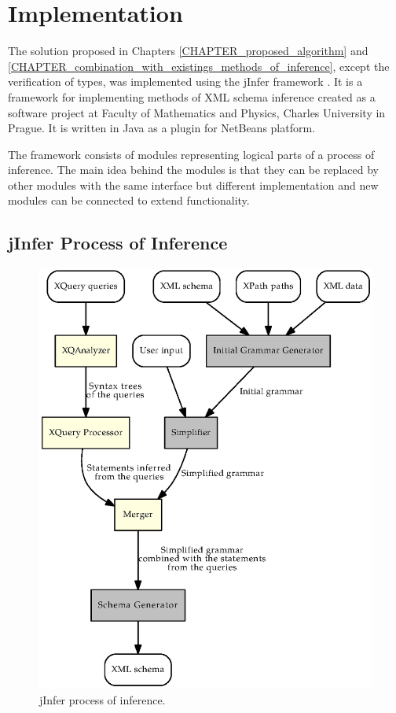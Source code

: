 \chapter{Implementation}
The solution proposed in Chapters \ref{CHAPTER_proposed_algorithm} and \ref{CHAPTER_combination_with_existings_methods_of_inference}, except the verification of types, was implemented using the jInfer framework \cite{jinfer}. It is a framework for implementing methods of XML schema inference created as a software project at Faculty of Mathematics and Physics, Charles University in Prague. It is written in Java as a plugin for NetBeans platform.

The framework consists of modules representing logical parts of a process of inference. The main idea behind the modules is that they can be replaced by other modules with the same interface but different implementation and new modules can be connected to extend functionality.

\section{jInfer Process of Inference}
\begin{figure}
\label{FIG_jinfer_steps}
\caption{jInfer process of inference.}
\includegraphics[scale=0.9]{jinfer_steps.eps}
\end{figure}

